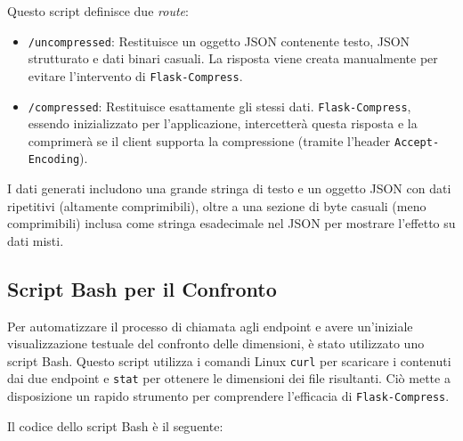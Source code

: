 Questo script definisce due \textit{route}:
\begin{itemize}
    \item \texttt{/uncompressed}: Restituisce un oggetto JSON contenente testo, JSON strutturato e dati binari casuali. La risposta viene creata manualmente per evitare l'intervento di \texttt{Flask-Compress}.
    \item \texttt{/compressed}: Restituisce esattamente gli stessi dati. \texttt{Flask-Compress}, essendo inizializzato per l'applicazione, intercetterà questa risposta e la comprimerà se il client supporta la compressione (tramite l'header \texttt{Accept-Encoding}).
\end{itemize}
I dati generati includono una grande stringa di testo e un oggetto JSON con dati ripetitivi (altamente comprimibili), oltre a una sezione di byte casuali (meno comprimibili) inclusa come stringa esadecimale nel JSON per mostrare l'effetto su dati misti.

\subsection{Script Bash per il Confronto}
Per automatizzare il processo di chiamata agli endpoint e avere un'iniziale visualizzazione testuale del confronto delle dimensioni, è stato utilizzato uno script Bash. Questo script utilizza i comandi Linux \texttt{curl} per scaricare i contenuti dai due endpoint e \texttt{stat} per ottenere le dimensioni dei file risultanti. Ciò mette a disposizione un rapido strumento per comprendere l'efficacia di \texttt{Flask-Compress}.

Il codice dello script Bash è il seguente:

